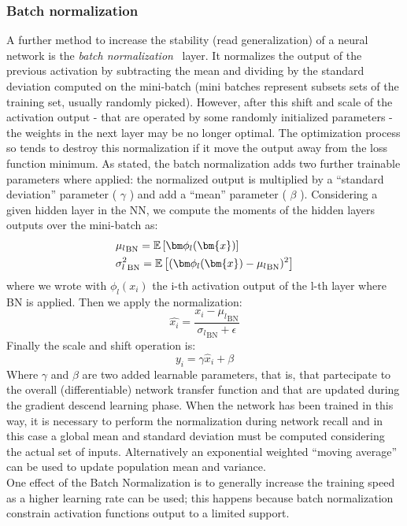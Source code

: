 \subsubsection{Batch normalization}
A further method to increase the stability (read generalization) of a neural network is the \textit{batch normalization}~\cite{ioffe2015batch} layer. It normalizes the output of the previous activation by subtracting the mean and dividing by the standard deviation computed on the mini-batch (mini batches represent subsets sets of the training set, usually randomly picked).  However, after this shift and scale of the activation output - that are operated by some randomly initialized parameters - the weights in the next layer may be no longer optimal. The optimization process so tends to destroy this normalization if it move the output away from the loss function minimum.
As stated, the batch normalization adds two further trainable parameters where applied: the normalized output is multiplied by a “standard deviation” parameter ( $\gamma$ ) and add a “mean” parameter ( $\beta$ ). 
Considering a given hidden layer in the NN, we compute the moments of the hidden layers outputs over the mini-batch as:
\begin{align*}
    & {\mu_l}_{\text{BN}} = \expectation{\bm\phi_l(\bm{x})} \\
    & {\sigma^2_l}_{\text{BN}} = \expectation{ (\bm\phi_l(\bm{x}) - {\mu_l}_{\text{BN}})^2 }
\end{align*}
where we wrote with $\phi_l(x_i)$ the i-th activation output of the l-th layer where BN is applied.
Then we apply the normalization:
\begin{equation}
    \hat{x_i} = \frac{x_i - {\mu_l}_{\text{BN}}}{ {\sigma_l}_{\text{BN}} + \epsilon }
\end{equation}
Finally the scale and shift operation is:
\begin{equation}
    y_i = \gamma \hat x_i + \beta
\end{equation}
Where $\gamma$ and $\beta$ are two added learnable parameters, that is, that partecipate to the overall (differentiable) network transfer function and that are updated during the gradient descend learning phase. When the network has been trained in this way, it is necessary to perform the normalization during network recall and in this case a global mean and standard deviation must be computed considering the actual set of inputs. Alternatively an exponential weighted “moving average” can be used to update population mean and variance. \\
One effect of the Batch Normalization is to generally increase the training speed as a higher learning rate can be used; this happens because batch normalization constrain activation functions output to a limited support. 

